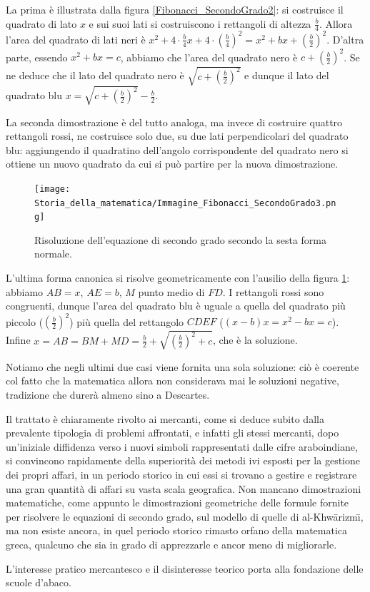 \par La prima \`e illustrata dalla figura \ref{Fibonacci_SecondoGrado2}: si costruisce il quadrato di lato $x$ e sui suoi lati si costruiscono i rettangoli di altezza $\frac{b}{4}$. Allora l'area del quadrato di lati neri \`e $x^2 + 4 \cdot \frac{b}{4}x + 4 \cdot \left ( \frac{b}{4} \right )^2 = x^2 + bx + \left ( \frac{b}{2} \right )^2$. D'altra parte, essendo $x^2 + bx = c$, abbiamo che l'area del quadrato nero \`e $c + \left ( \frac{b}{2} \right )^2$. Se ne deduce che il lato del quadrato nero \`e $\sqrt{c + \left ( \frac{b}{2} \right )^2}$ e dunque il lato del quadrato blu $x = \sqrt{c + \left ( \frac{b}{2} \right )^2} - \frac{b}{2}$.
\par La seconda dimostrazione \`e del tutto analoga, ma invece di costruire quattro rettangoli rossi, ne costruisce solo due, su due lati perpendicolari del quadrato blu: aggiungendo il quadratino dell'angolo corrispondente del quadrato nero si ottiene un nuovo quadrato da cui si pu\`o partire per la nuova dimostrazione.
\begin{figure}
	\texttt{[image: Storia\_della\_matematica/Immagine\_Fibonacci\_SecondoGrado3.png]}
	\caption{Risoluzione dell'equazione di secondo grado secondo la sesta forma normale.}
	\label{Fibonacci_SecondoGrado3}
\end{figure}
\par L'ultima forma canonica si risolve geometricamente con l'ausilio della figura \ref{Fibonacci_SecondoGrado3}: abbiamo $AB = x$, $AE = b$, $M$ punto medio di $FD$. I rettangoli rossi sono congruenti, dunque l'area del quadrato blu \`e uguale a quella del quadrato pi\`u piccolo ($\left ( \frac{b}{2} \right )^2$) pi\`u quella del rettangolo $CDEF$ ($(x - b)x = x^2 - bx = c$). Infine $x = AB = BM + MD = \frac{b}{2} + \sqrt{\left ( \frac{b}{2} \right )^2 + c}$, che \`e la soluzione.
\par Notiamo che negli ultimi due casi viene fornita una sola soluzione: ci\`o \`e coerente col fatto che la matematica allora non considerava mai le soluzioni negative, tradizione che durer\`a almeno sino a Descartes.
\par Il trattato \`e chiaramente rivolto ai mercanti, come si deduce subito dalla prevalente tipologia di problemi affrontati, e infatti gli stessi mercanti, dopo un'iniziale diffidenza verso i nuovi simboli rappresentati dalle cifre araboindiane, si convincono rapidamente della superiorit\`a dei metodi ivi esposti per la gestione dei propri affari, in un periodo storico in cui essi si trovano a gestire e registrare una gran quantit\`a di affari su vasta scala geografica. Non mancano dimostrazioni matematiche, come appunto le dimostrazioni geometriche delle formule fornite per risolvere le equazioni di secondo grado, sul modello di quelle di al-Khw\=arizm\={\i}, ma non esiste ancora, in quel periodo storico rimasto orfano della matematica greca, qualcuno che sia in grado di apprezzarle e ancor meno di migliorarle.
\par L'interesse pratico mercantesco e il disinteresse teorico porta alla fondazione delle scuole d'abaco.
